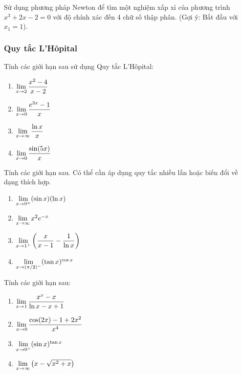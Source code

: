 \begin{exercise}
Sử dụng phương pháp Newton để tìm một nghiệm xấp xỉ của phương trình $x^3 + 2x - 2 = 0$ với độ chính xác đến 4 chữ số thập phân. (Gợi ý: Bắt đầu với $x_1 = 1$).
\end{exercise}

\subsubsection{Quy tắc L'Hôpital}

\begin{exercise}
Tính các giới hạn sau sử dụng Quy tắc L'Hôpital:
\begin{enumerate}[label=(\alph*)]
    \item $\lim\limits_{x \to 2} \dfrac{x^2 - 4}{x - 2}$
    \item $\lim\limits_{x \to 0} \dfrac{e^{3x} - 1}{x}$
    \item $\lim\limits_{x \to \infty} \dfrac{\ln x}{x}$
    \item $\lim\limits_{x \to 0} \dfrac{\sin(5x)}{x}$
\end{enumerate}
\end{exercise}

\begin{exercise}
Tính các giới hạn sau. Có thể cần áp dụng quy tắc nhiều lần hoặc biến đổi về dạng thích hợp.
\begin{enumerate}[label=(\alph*)]
    \item $\lim\limits_{x \to 0^+} (\sin x)(\ln x)$
    \item $\lim\limits_{x \to \infty} x^2 e^{-x}$
    \item $\lim\limits_{x \to 1^+} \left( \dfrac{x}{x-1} - \dfrac{1}{\ln x} \right)$
    \item $\lim\limits_{x \to (\pi/2)^-} (\tan x)^{\cos x}$
\end{enumerate}
\end{exercise}

\begin{exercise}
Tính các giới hạn sau:
\begin{enumerate}[label=(\alph*)]
    \item $\lim\limits_{x \to 1} \dfrac{x^x - x}{\ln x - x + 1}$
    \item $\lim\limits_{x \to 0} \dfrac{\cos(2x) - 1 + 2x^2}{x^4}$
    \item $\lim\limits_{x \to 0^+} (\sin x)^{\tan x}$
    \item $\lim\limits_{x \to \infty} \left(x - \sqrt{x^2 + x}\right)$
\end{enumerate}
\end{exercise}

